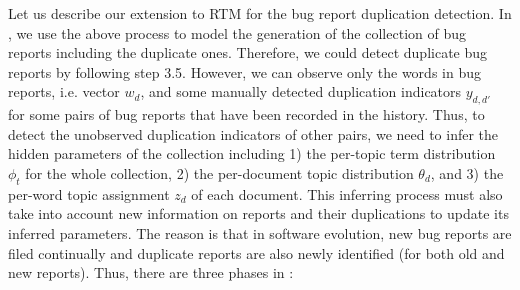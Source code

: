 Let us describe our extension to RTM for the bug report duplication
detection. In {\model}, we use the above process to model the
generation of the collection of bug reports including the duplicate
ones. Therefore, we could detect duplicate bug reports by following
step 3.5. However, we can observe only the words in bug reports,
i.e. vector $w_d$, and some manually detected duplication indicators
$y_{d,d'}$ for some pairs of bug reports that have been recorded in
the history. Thus, to detect the unobserved duplication indicators of
other pairs, we need to infer the hidden parameters of the collection
including 1) the per-topic term distribution $\phi_t$ for the whole
collection, 2) the per-document topic distribution $\theta_d$, and 3)
the per-word topic assignment $z_d$ of each document. This inferring
process must also take into account new information on reports and
their duplications to update its inferred parameters. The reason is
that in software evolution, new bug reports are filed continually and
duplicate reports are also newly identified (for both old and new
reports). Thus, there are three phases in {\model}:

